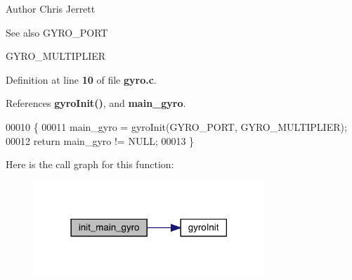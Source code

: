 \begin{DoxyAuthor}{Author}
Chris Jerrett 
\end{DoxyAuthor}
\begin{DoxySeeAlso}{See also}
G\+Y\+R\+O\+\_\+\+P\+O\+RT 

G\+Y\+R\+O\+\_\+\+M\+U\+L\+T\+I\+P\+L\+I\+ER 
\end{DoxySeeAlso}


Definition at line \textbf{ 10} of file \textbf{ gyro.\+c}.



References \textbf{ gyro\+Init()}, and \textbf{ main\+\_\+gyro}.


\begin{DoxyCode}
00010                       \{
00011   main_gyro = gyroInit(GYRO\_PORT, GYRO\_MULTIPLIER);
00012   \textcolor{keywordflow}{return} main_gyro != NULL;
00013 \}
\end{DoxyCode}
Here is the call graph for this function\+:
\nopagebreak
\begin{figure}[H]
\begin{center}
\leavevmode
\includegraphics[width=246pt]{gyro_8h_a47c0a78a867be91a28e278bf433d699c_cgraph}
\end{center}
\end{figure}
